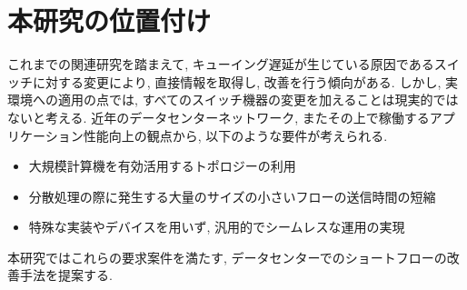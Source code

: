 \section{本研究の位置付け}
これまでの関連研究を踏まえて, キューイング遅延が生じている原因であるスイッチに対する変更により, 直接情報を取得し, 改善を行う傾向がある. 
しかし, 実環境への適用の点では, すべてのスイッチ機器の変更を加えることは現実的ではないと考える. 
近年のデータセンターネットワーク, またその上で稼働するアプリケーション性能向上の観点から, 以下のような要件が考えられる.
\begin{itemize}
  \item 大規模計算機を有効活用するトポロジーの利用
  \item 分散処理の際に発生する大量のサイズの小さいフローの送信時間の短縮
  \item 特殊な実装やデバイスを用いず, 汎用的でシームレスな運用の実現
\end{itemize}
本研究ではこれらの要求案件を満たす, データセンターでのショートフローの改善手法を提案する. 
